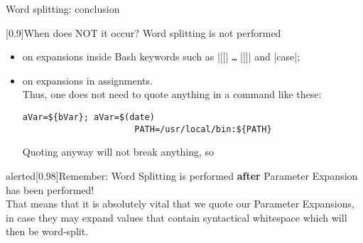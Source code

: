 \begin{frame}[fragile]{Word splitting: conclusion}
    \vspace{-4  mm}
        \begin{varblock*}{}[0.9\textwidth]{When does NOT it occur?}
        Word splitting is not performed
        \begin{itemize}
            \item on expansions inside Bash keywords such as \bash|[[| \texttt{\ldots} \bash|]]| and \bash|case|;
            \item on expansions in assignments. \\[0.3em] Thus, one does not need to quote anything in a command like these:
                  \begin{lstlisting}[style=MyBash, numbers=none, xrightmargin=45mm, belowskip=-5mm, aboveskip=2mm]
                      aVar=${bVar}; aVar=$(date)
                      PATH=/usr/local/bin:${PATH}
                  \end{lstlisting}
                  Quoting anyway will not break anything, so 
        \end{itemize}
    \end{varblock*}
    \begin{varblock}{alerted}[0.98\textwidth]{Remember:}
        \alert{Word Splitting is performed \textbf{after} Parameter Expansion has been performed!} \\
        That means that it is absolutely vital that we quote our Parameter Expansions, in case they may expand values that contain syntactical whitespace which will then be word-split.
    \end{varblock}
\end{frame}
